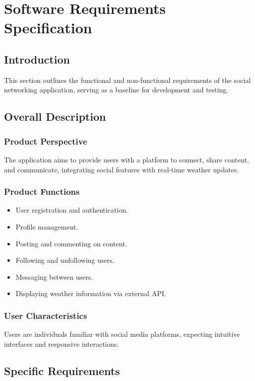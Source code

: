 \documentclass[12pt,a4paper]{report}
\begin{document}
\chapter{Software Requirements Specification}
\section{Introduction}
This section outlines the functional and non-functional requirements of the social networking application, serving as a baseline for development and testing.

\section{Overall Description}
\subsection{Product Perspective}
The application aims to provide users with a platform to connect, share content, and communicate, integrating social features with real-time weather updates.

\subsection{Product Functions}
\begin{itemize}
    \item User registration and authentication.
    \item Profile management.
    \item Posting and commenting on content.
    \item Following and unfollowing users.
    \item Messaging between users.
    \item Displaying weather information via external API.
\end{itemize}

\subsection{User Characteristics}
Users are individuals familiar with social media platforms, expecting intuitive interfaces and responsive interactions.

\section{Specific Requirements}
\end{document}
